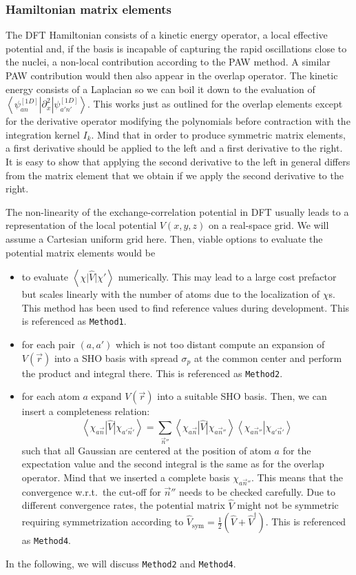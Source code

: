 \documentclass[oribibl]{llncs}
\newcommand{\um}[1]{_{\mathrm{#1}}}
\newcommand{\ttt}[1]{\texttt{#1}}
\newcommand{\braket}[2]{\left\langle \left. #1 \right| #2 \right\rangle}
\newcommand{\braketop}[3]{\left\langle \left. #1 \right| #2 \left| #3 \right. \right\rangle}
\begin{document}
\subsubsection{Hamiltonian matrix elements}
The \ac{DFT} Hamiltonian consists of a kinetic energy operator,
a local effective potential 
and, if the basis is incapable of
capturing the rapid oscillations close to the nuclei,
a non-local contribution according to the \ac{PAW} method.
A similar \ac{PAW} contribution would then also appear in the overlap operator.
The kinetic energy consists of a Laplacian so we can boil it down to the evaluation
of $\braketop{ \psi^{[1D]}_{an} }{ \partial^2_x }{ \psi^{[1D]}_{a'n'} }$.
This works just as outlined for the overlap elements
except for the derivative operator modifying the polynomials before contraction with the integration kernel $I_k$.
Mind that in order to produce symmetric matrix elements,
a first derivative should be applied to the left and a first derivative to the right.
It is easy to show that applying the second derivative to the left in general differs from
the matrix element that we obtain if we apply the second derivative to the right.

The non-linearity of the exchange-correlation potential in \ac{DFT} usually
leads to a representation of the local potential $V(x,y,z)$ on a real-space grid.
We will assume a Cartesian uniform grid here.
Then, viable options to evaluate the potential matrix elements would be
\begin{itemize}
%
\item to evaluate $\braketop{ \chi }{ \hat V }{ \chi' }$ numerically. 
This may lead to a large cost prefactor but scales linearly with the number of atoms due to the localization of $\chi$s.
This method has been used to find reference values during development. This is referenced as \ttt{Method1}.
%
\item for each pair $(a,a')$ which is not too distant
compute an expansion of $V(\vec r)$ into a \ac{SHO} basis with spread $\sigma_p$
at the common center and perform the product and integral there. This is referenced as \ttt{Method2}.
%
\item for each atom $a$ expand $V(\vec r)$ into a suitable \ac{SHO} basis. 
Then, we can insert a completeness relation: %
\begin{equation}
 \braketop{ \chi_{a\vec n} }{ \hat V }{ \chi_{a'\vec n'} } = \sum_{\vec n''}
 \braketop{ \chi_{a\vec n} }{ \hat V }{ \chi_{a\vec n''} } \braket{ \chi_{a\vec n''} }{ \chi_{a'\vec n'} }
\end{equation}
such that all Gaussian are centered at the position of atom $a$ for the expectation value
and the second integral is the same as for the overlap operator.
Mind that we inserted a complete basis $\chi_{a\vec n''}$. 
This means that the convergence w.r.t.~the cut-off for $\vec n''$ needs to be checked carefully.
Due to different convergence rates, the potential matrix $\hat V$ might not be symmetric
requiring symmetrization according to $\hat V\um{sym} = \frac 12 \left( \hat V + \hat V^\dagger \right)$. This is referenced as \ttt{Method4}.
%
\end{itemize}
In the following, we will discuss \ttt{Method2} and \ttt{Method4}.
\end{document}
